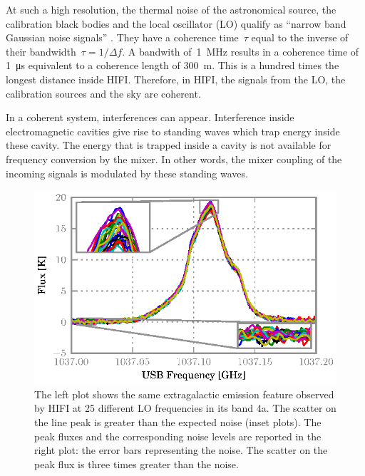 \documentclass[a4paper,11pt]{article}
\begin{document}
At such a high resolution, the thermal noise of the astronomical source, the calibration black bodies and the local oscillator (LO) qualify as ``narrow band Gaussian noise signals'' \cite{siegman1986lasers}.
They have a coherence time~$\tau$ equal to the inverse of their bandwidth~$\tau=1/\Delta f$.
A bandwith of~\SI{1}{\mega\hertz} results in a coherence time of \SI{1}{\micro\second} equivalent to a coherence length of \SI{300}{\meter}.
This is a hundred times the longest distance inside HIFI.
Therefore, in HIFI, the signals from the LO, the calibration sources and the sky are coherent.

In a coherent system, interferences can appear.
Interference inside electromagnetic cavities give rise to standing waves which trap energy inside these cavity.
The energy that is trapped inside a cavity is not available for frequency conversion by the mixer.
In other words, the mixer coupling of the incoming signals is modulated by these standing waves.

\begin{figure}[hbt]
    \centering
    \includegraphics{obsid_5000352C}
    \caption{\label{fig:scatter_real_data}
    The left plot shows the same extragalactic emission feature observed by HIFI at 25 different LO frequencies in its band 4a.
    The scatter on the line peak is greater than the expected noise (inset plots).
    The peak fluxes and the corresponding noise levels are reported in the right plot: the error bars representing the noise.
    The scatter on the peak flux is three times greater than the noise.
    }
\end{figure}
\end{document}

